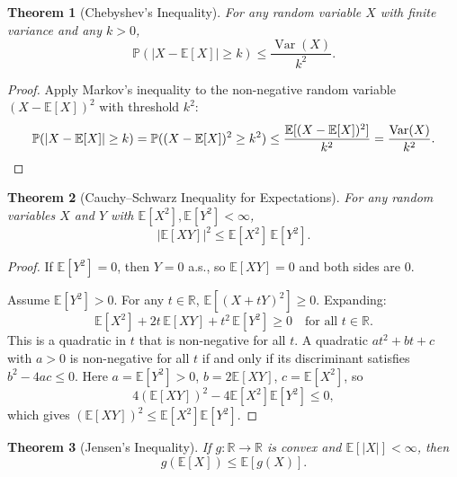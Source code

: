 \documentclass[11pt,a4paper]{article}
\theoremstyle{definition}
\theoremstyle{plain}
\newtheorem{theorem}{Theorem}[section]
\theoremstyle{remark}
\newcommand{\R}{\mathbb{R}}
\newcommand{\E}{\mathbb{E}}
\newcommand{\Prob}{\mathbb{P}}
\DeclareMathOperator{\Var}{Var}
\begin{document}
\begin{theorem}[Chebyshev's Inequality]
\label{thm:chebyshev}
For any random variable $X$ with finite variance and any $k > 0$,
\[
    \Prob(|X - \E[X]| \geq k) \leq \frac{\Var(X)}{k^2}.
\]
\end{theorem}

\begin{proof}
Apply Markov's inequality to the non-negative random variable $(X - \E[X])^2$ with
threshold $k^2$:
\[
    \Prob(|X - \E[X]| \geq k) = \Prob((X - \E[X])^2 \geq k^2)
    \leq \frac{\E[(X - \E[X])^2]}{k^2} = \frac{\Var(X)}{k^2}.
    \qedhere
\]
\end{proof}

\begin{theorem}[Cauchy--Schwarz Inequality for Expectations]
\label{thm:cauchy_schwarz}
For any random variables $X$ and $Y$ with $\E[X^2], \E[Y^2] < \infty$,
\[
    |\E[XY]|^2 \leq \E[X^2]\,\E[Y^2].
\]
\end{theorem}

\begin{proof}
If $\E[Y^2] = 0$, then $Y = 0$ a.s., so $\E[XY] = 0$ and both sides are $0$.

Assume $\E[Y^2] > 0$. For any $t \in \R$, $\E[(X + tY)^2] \geq 0$. Expanding:
\[
    \E[X^2] + 2t\,\E[XY] + t^2\,\E[Y^2] \geq 0 \quad \text{for all } t \in \R.
\]
This is a quadratic in $t$ that is non-negative for all $t$. A quadratic $at^2 + bt + c$
with $a > 0$ is non-negative for all $t$ if and only if its discriminant satisfies
$b^2 - 4ac \leq 0$. Here $a = \E[Y^2] > 0$, $b = 2\E[XY]$, $c = \E[X^2]$, so
\[
    4(\E[XY])^2 - 4\E[X^2]\E[Y^2] \leq 0,
\]
which gives $(\E[XY])^2 \leq \E[X^2]\E[Y^2]$.
\end{proof}

\begin{theorem}[Jensen's Inequality]
\label{thm:jensen}
If $g \colon \R \to \R$ is convex and $\E[|X|] < \infty$, then
\[
    g(\E[X]) \leq \E[g(X)].
\]
\end{theorem}
\end{document}
